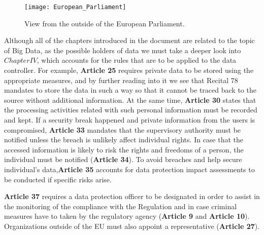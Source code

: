 \begin{figure}[H]
	\caption{View from the outside of the European Parliament.}
	\label{fig:European_Parliament}
	\texttt{[image: European\_Parliament]}
\end{figure}

Although all of the chapters introduced in the document are related to the topic of Big Data, as the possible holders of data we must take a deeper look into $Chapter IV$, which accounts for the rules that are to be applied to the data controller. For example, \textbf{Article 25} requires private data to be stored using the appropriate measures, and by further reading into it we see that Recital 78 mandates to store the data in such a way so that it cannot be traced back to the source without additional information. At the same time, \textbf{Article 30} states that the processing activities related with such personal information must be recorded and kept. If a security break happened and private information from the users is compromised, \textbf{Article 33} mandates that the supervisory authority must be notified unless the breach is unlikely affect individual rights. In case that the accessed information is likely to risk the rights and freedoms of a person, the individual must be notified (\textbf{Article 34}). To avoid breaches and help secure individual's data,\textbf{Article 35} accounts for data protection impact assessments to be conducted if specific risks arise.\par

\textbf{Article 37} requires a data protection officer to be designated in order to assist in the monitoring of the compliance with the Regulation and in case criminal measures have to taken by the regulatory agency (\textbf{Article 9} and \textbf{Article 10}). Organizations outside of the EU must also appoint a representative (\textbf{Article 27}).\par




